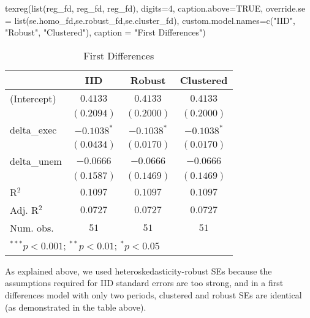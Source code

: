 \documentclass[
]{article}
\newenvironment{Shaded}{\begin{snugshade}}{\end{snugshade}}
\newcommand{\AttributeTok}[1]{\textcolor[rgb]{0.77,0.63,0.00}{#1}}
\newcommand{\ConstantTok}[1]{\textcolor[rgb]{0.00,0.00,0.00}{#1}}
\newcommand{\DecValTok}[1]{\textcolor[rgb]{0.00,0.00,0.81}{#1}}
\newcommand{\FunctionTok}[1]{\textcolor[rgb]{0.00,0.00,0.00}{#1}}
\newcommand{\NormalTok}[1]{#1}
\newcommand{\StringTok}[1]{\textcolor[rgb]{0.31,0.60,0.02}{#1}}
\begin{document}
\newpage

\begin{Shaded}
\begin{Highlighting}[]
\FunctionTok{texreg}\NormalTok{(}\FunctionTok{list}\NormalTok{(reg\_fd, reg\_fd, reg\_fd), }\AttributeTok{digits=}\DecValTok{4}\NormalTok{, }\AttributeTok{caption.above=}\ConstantTok{TRUE}\NormalTok{,}
       \AttributeTok{override.se =} \FunctionTok{list}\NormalTok{(se.homo\_fd,se.robust\_fd,se.cluster\_fd),}
       \AttributeTok{custom.model.names=}\FunctionTok{c}\NormalTok{(}\StringTok{"IID"}\NormalTok{, }\StringTok{"Robust"}\NormalTok{, }\StringTok{"Clustered"}\NormalTok{),}
       \AttributeTok{caption =} \StringTok{"First Differences"}\NormalTok{)}
\end{Highlighting}
\end{Shaded}

\begin{table}
\caption{First Differences}
\begin{center}
\begin{tabular}{l c c c}
\hline
 & IID & Robust & Clustered \\
\hline
(Intercept) & $0.4133$      & $0.4133$      & $0.4133$      \\
            & $(0.2094)$    & $(0.2000)$    & $(0.2000)$    \\
delta\_exec & $-0.1038^{*}$ & $-0.1038^{*}$ & $-0.1038^{*}$ \\
            & $(0.0434)$    & $(0.0170)$    & $(0.0170)$    \\
delta\_unem & $-0.0666$     & $-0.0666$     & $-0.0666$     \\
            & $(0.1587)$    & $(0.1469)$    & $(0.1469)$    \\
\hline
R$^2$       & $0.1097$      & $0.1097$      & $0.1097$      \\
Adj. R$^2$  & $0.0727$      & $0.0727$      & $0.0727$      \\
Num. obs.   & $51$          & $51$          & $51$          \\
\hline
\multicolumn{4}{l}{\scriptsize{$^{***}p<0.001$; $^{**}p<0.01$; $^{*}p<0.05$}}
\end{tabular}
\label{table:coefficients}
\end{center}
\end{table}

As explained above, we used heteroskedasticity-robust SEs because the
assumptions required for IID standard errors are too strong, and in a
first differences model with only two periods, clustered and robust SEs
are identical (as demonstrated in the table above).
\end{document}
